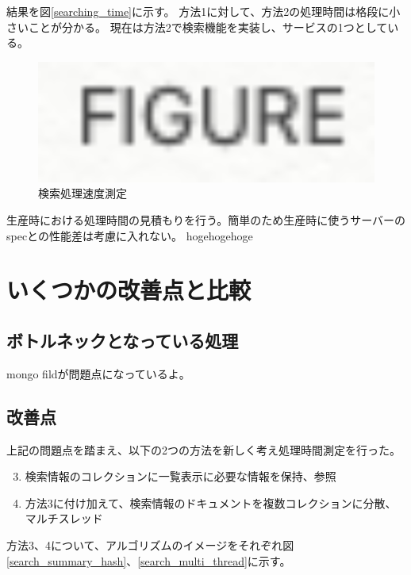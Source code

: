 結果を図\ref{searching_time}に示す。
方法1に対して、方法2の処理時間は格段に小さいことが分かる。
現在は方法2で検索機能を実装し、サービスの1つとしている。

\begin{figure}[bpt]
  \begin{center}
    \includegraphics[width=16cm]{figure}
  \caption[検索処理速度測定]{検索処理速度測定}
  \label{search_python_list_problem}
  \end{center}
\end{figure}

生産時における処理時間の見積もりを行う。簡単のため生産時に使うサーバーのspecとの性能差は考慮に入れない。
hogehogehoge
 
\section{いくつかの改善点と比較}
\subsection{ボトルネックとなっている処理}
mongo fildが問題点になっているよ。

\subsection{改善点}
上記の問題点を踏まえ、以下の2つの方法を新しく考え処理時間測定を行った。

\begin{enumerate}
  \setcounter{enumi}{2}
  \item 検索情報のコレクションに一覧表示に必要な情報を保持、参照 
  \item 方法3に付け加えて、検索情報のドキュメントを複数コレクションに分散、マルチスレッド
\end{enumerate}

方法3、4について、アルゴリズムのイメージをそれぞれ図\ref{search_summary_hash}、\ref{search_multi_thread}に示す。

